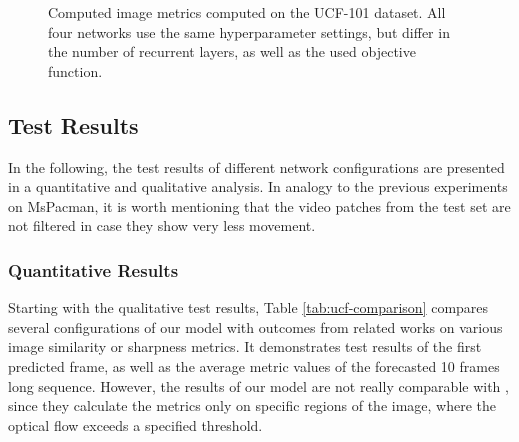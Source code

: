 \begin{figure}[htb]
\begin{subfigure}{0.5\textwidth}
{
  }
  \caption{}
  \label{fig:plot-ucf-loss-ssim}
\end{subfigure}
\caption[Comparison of Image Metrics on UCF-101]{Computed image metrics computed on the UCF-101 dataset. All four networks use the same hyperparameter settings, but differ in the number of recurrent layers, as well as the used objective function.} \label{fig:plot-ucf-imgmetric}
\end{figure}








\subsection{Test Results}

In the following, the test results of different network configurations are presented in a quantitative and qualitative analysis. In analogy to the previous experiments on MsPacman, it is worth mentioning that the video patches from the test set are not filtered in case they show very less movement.

\subsubsection{Quantitative Results}

Starting with the qualitative test results, Table \ref{tab:ucf-comparison} compares several configurations of our model with outcomes from related works on various image similarity or sharpness metrics. It demonstrates test results of the first predicted frame, as well as the average metric values of the forecasted 10 frames long sequence. However, the results of our model are not really comparable with \parencite{deep_multiscale_video_pred}, since they calculate the metrics only on specific regions of the image, where the optical flow exceeds a specified threshold.

